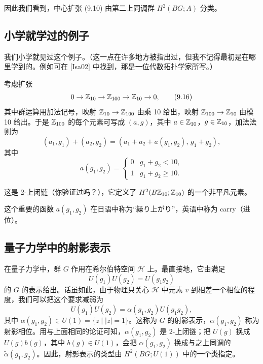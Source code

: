 因此我们看到，中心扩张 (9.10) 由第二上同调群 $H^2(BG;A)$ 分类。

\subsection{小学就学过的例子}

我们小学就见过这个例子。（这一点在许多地方被指出过，但我不记得最初是在哪里学到的。例如可在 [Isa02] 中找到，那是一位代数拓扑学家所写。）

考虑扩张
\begin{equation}
  0\to\mathbb{Z}_{10}\to\mathbb{Z}_{100}\to\mathbb{Z}_{10}\to 0,
  \tag{9.16}
\end{equation}
其中群运算用加法记号，映射 $\mathbb{Z}_{10}\to\mathbb{Z}_{100}$ 由乘 10 给出，映射 $\mathbb{Z}_{100}\to\mathbb{Z}_{10}$ 由模 10 给出。于是 $\mathbb{Z}_{100}$ 的每个元素可写成 $(a,g)$，其中 $a\in\mathbb{Z}_{10}$，$g\in\mathbb{Z}_{10}$，加法法则为
\begin{equation}
  (a_1,g_1)+(a_2,g_2)=(a_1+a_2+a(g_1,g_2),\,g_1+g_2),
  \tag{9.17}
\end{equation}
其中
\begin{equation}
  a(g_1,g_2)=
  \begin{cases}
    0 & g_1+g_2<10,\\
    1 & g_1+g_2\ge 10.
  \end{cases}
  \tag{9.18}
\end{equation}

这是 2-上闭链（你验证过吗？），它定义了 $H^2(B\mathbb{Z}_{10};\mathbb{Z}_{10})$ 的一个非平凡元素。

这个重要的函数 $a(g_1,g_2)$ 在日语中称为“繰り上がり”，英语中称为 carry（进位）。

\subsection{量子力学中的射影表示}

在量子力学中，群 $G$ 作用在希尔伯特空间 $\mathcal H$ 上。最直接地，它由满足
\begin{equation}
  U(g_1)U(g_2)=U(g_1g_2)
  \tag{9.19}
\end{equation}
的 $G$ 的表示给出。话虽如此，由于物理只关心 $\mathcal H$ 中元素 $v$ 到相差一个相位的程度，我们可以把这个要求减弱为
\begin{equation}
  U(g_1)U(g_2)=\alpha(g_1,g_2)U(g_1g_2),
  \tag{9.20}
\end{equation}
其中 $\alpha(g_1,g_2)\in U(1)=\{z\mid |z|=1\}$。这称为 $G$ 的射影表示，$\alpha(g_1,g_2)$ 称为射影相位。用与上面相同的论证可知，$\alpha(g_1,g_2)$ 是 2-上闭链；把 $U(g)$ 换成 $U(g)b(g)$，其中 $b(g)\in U(1)$，会把 $\alpha(g_1,g_2)$ 换成与之上同调的 $\tilde\alpha(g_1,g_2)$。因此，射影表示的类型由 $H^2(BG;U(1))$ 中的一个类指定。

